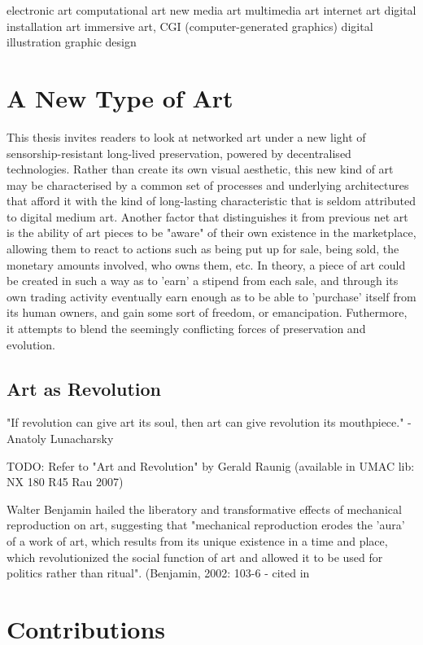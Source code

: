electronic art
computational art
new media art
multimedia art
internet art
digital installation art
immersive art,
CGI (computer-generated graphics)
digital illustration
graphic design


\section{A New Type of Art}

This thesis invites readers to look at networked art under a new light of sensorship-resistant long-lived preservation, powered by decentralised technologies. Rather than create its own visual aesthetic, this new kind of art may be characterised by a common set of processes and underlying architectures that afford it with the kind of long-lasting characteristic that is seldom attributed to digital medium art.
Another factor that distinguishes it from previous net art is the ability of art pieces to be "aware" of their own existence in the marketplace, allowing them to react to actions such as being put up for sale, being sold, the monetary amounts involved, who owns them, etc.
In theory, a piece of art could be created in such a way as to 'earn' a stipend from each sale, and through its own trading activity eventually earn enough as to be able to 'purchase' itself from its human owners, and gain some sort of freedom, or emancipation.
Futhermore, it attempts to blend the seemingly conflicting forces of preservation and evolution.

\subsection{Art as Revolution}

"If revolution can give art its soul, then art can give revolution its mouthpiece." - Anatoly Lunacharsky

TODO: Refer to "Art and Revolution" by Gerald Raunig (available in UMAC lib: NX 180 R45 Rau 2007)

Walter Benjamin hailed the liberatory and transformative effects of mechanical reproduction on art, suggesting that "mechanical reproduction erodes the 'aura' of a work of art, which results from its unique existence in a time and place, which revolutionized the social function of art and allowed it to be used for politics rather than ritual". (Benjamin, 2002: 103-6 - cited in \cite[p.3]{gereArtTimeTechnology2006}

\section{Contributions}

